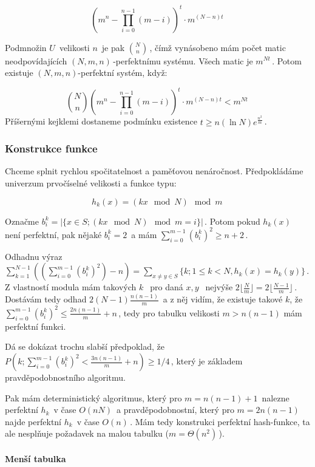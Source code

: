 \[\left(m^n-\prod_{i=0}^{n-1}(m-i)\right)^t\cdot m^{(N-n)t}\,\!\]

Podmnožin \(U\,\!\) velikosti \(n\,\!\) je pak
\(\mathbf{}\binom{N}{n}\,\!\), čímž vynásobeno mám počet matic
neodpovídajících \((N,m,n)\,\!\)-perfektnímu systému. Všech matic je
\(m^{Nt}\,\!\). Potom existuje \((N,m,n)\)-perfektní systém, když:

\[\mathbf{}\binom{N}{n} \left(m^n-\prod_{i=0}^{n-1}(m-i)\right)^t\cdot m^{(N-n)t} < m^{Nt}\,\!\]
Příšernými kejklemi dostaneme podmínku existence
\(t\geq n(\ln N)e^{\frac{n^2}{m}}\,\!\).

\subsubsection{Konstrukce funkce}\label{konstrukce-funkce}

Chceme splnit rychlou spočitatelnost a paměťovou nenáročnost.
Předpokládáme univerzum prvočíselné velikosti a funkce typu:

\[h_k(x)=(kx\mod N)\mod m\,\!\]

Označme \(b_i^k=|\{x\in S; (kx\mod N)\mod m=i\}|\,\!\). Potom pokud
\(h_k(x)\,\!\) není perfektní, pak nějaké \(b_i^k =2\,\!\) a mám
\(\sum_{i=0}^{m-1}(b_i^k)^2\geq n+2\,\!\).

Odhadnu výraz
\(\sum_{k=1}^{N-1}((\sum_{i=0}^{m-1}(b_i^k)^2)-n) = \sum_{x\neq y\in S}\{k; 1\leq k<N, h_k(x)=h_k(y)\}\,\!\).
Z vlastností modula mám takových \(k\,\;\) pro daná \(x,y\,\;\) nejvýše
\(2\lfloor\frac{N}{m}\rfloor =2\lfloor\frac{N-1}{m}\rfloor\,\!\).
Dostávám tedy odhad \(2(N-1)\frac{n(n-1)}{m}\,\!\) a z něj vidím, že
existuje takové \(k\), že
\(\sum_{i=0}^{m-1}(b_i^k)^2\leq \frac{2n(n-1)}{m}+n\,\!\), tedy pro
tabulku velikosti \(m > n(n-1)\) mám perfektní funkci.

Dá se dokázat trochu slabší předpoklad, že
\(P(k;\sum_{i=0}^{m-1}(b_i^k)^2<\frac{3n(n-1)}{m}+n)\geq 1/4\,\!\),
který je základem pravděpodobnostního algoritmu.

Pak mám deterministický algoritmus, který pro \(m=n(n-1)+1\,\!\) nalezne
perfektní \(h_k\,\!\) v čase \(O(nN)\,\!\) a pravděpodobnostní, který
pro \(m=2n(n-1)\,\!\) najde perfektní \(h_k\,\!\) v čase \(O(n)\,\!\).
Mám tedy konstrukci perfektní hash-funkce, ta ale nesplňuje požadavek na
malou tabulku (\(m=\Theta(n^2)\,\!\)).

\paragraph{Menší tabulka}\label{menux161uxed-tabulka}

